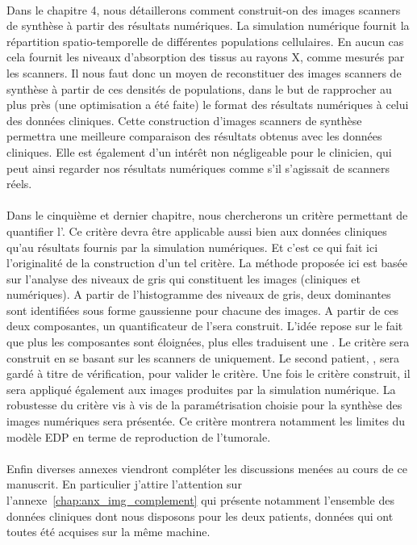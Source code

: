 \documentclass[main.tex]{subfiles}
\begin{document}
\paragraph{}
Dans le chapitre 4, nous détaillerons comment construit-on des images scanners de synthèse à partir des résultats numériques. La simulation numérique fournit la répartition spatio-temporelle de différentes populations cellulaires. En aucun cas cela fournit les niveaux d'absorption des tissus au rayons X, comme mesurés par les scanners. Il nous faut donc un moyen de reconstituer des images scanners de synthèse à partir de ces densités de populations, dans le but de rapprocher au plus près (une optimisation a été faite) le format des résultats numériques à celui des données cliniques.
Cette construction d'images scanners de synthèse permettra une meilleure comparaison des résultats obtenus avec les données cliniques. Elle est également d'un intérêt non négligeable pour le clinicien, qui peut ainsi regarder nos résultats numériques comme s'il s'agissait de scanners réels. 


\paragraph{}
Dans le cinquième et dernier chapitre, nous chercherons un critère permettant de quantifier l'\hetero.  Ce critère devra être applicable aussi bien aux données cliniques qu'au résultats fournis par la simulation numériques. Et c'est ce qui fait ici l'originalité de la construction d'un tel critère. La méthode proposée ici est basée sur l'analyse des niveaux de gris qui constituent les images (cliniques et numériques). A partir de l'histogramme des niveaux de gris, deux dominantes sont identifiées sous forme gaussienne pour chacune des images. 
A partir de ces deux composantes, un quantificateur de l'\hetero sera construit. L'idée repose sur le fait que plus les composantes sont éloignées, plus elles traduisent une \hetero. 
Le critère sera construit en se basant sur les scanners de \Nber uniquement. Le second patient, \Chen, sera gardé à titre de vérification, pour valider le critère. Une fois le critère construit, il sera appliqué également aux images produites par la simulation numérique. La robustesse du critère vis à vis de la paramétrisation choisie pour la synthèse des images  numériques sera présentée. Ce critère montrera notamment les limites du modèle EDP en terme de reproduction de l'\hetero tumorale.

\paragraph{}
Enfin diverses annexes viendront compléter les discussions menées au cours de ce manuscrit. En particulier j'attire l'attention sur l'annexe~\ref{chap:anx_img_complement} qui présente notamment l'ensemble des données cliniques dont nous disposons pour les deux patients, données qui ont toutes été acquises sur la même machine. 
\end{document}
